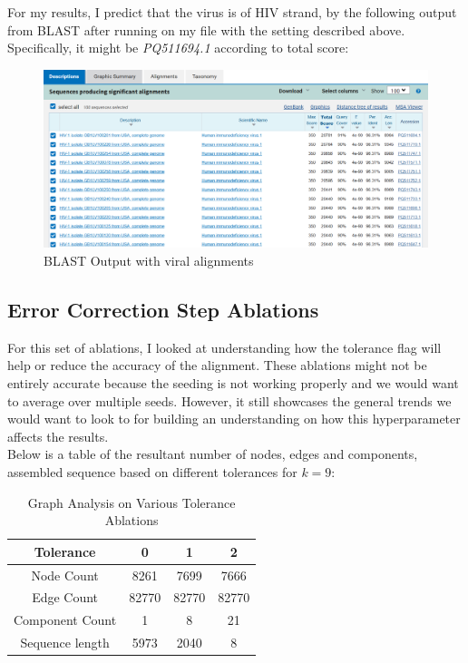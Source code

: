 \documentclass[10pt]{article}
\begin{document}
For my results, I predict that the virus is of HIV strand, by the following output from BLAST after running on my file with the setting described above. Specifically, it might be \textit{PQ511694.1} according to total score:
\begin{figure}[htbp]
    \centering
    \includegraphics[width=\textwidth]{figures/blast_output_k_10.PNG}
    \caption{BLAST Output with viral alignments}
    \label{fig:figure_7}
\end{figure}

\subsection*{Error Correction Step Ablations}
For this set of ablations, I looked at understanding how the tolerance flag will help or reduce the accuracy of the alignment. These ablations might not be entirely accurate because the seeding is not working properly and we would want to average over multiple seeds. However, it still showcases the general trends we would want to look to for building an understanding on how this hyperparameter affects the results.\\

Below is a table of the resultant number of nodes, edges and components, assembled sequence based on different tolerances for $k=9$:\\
\begin{table}[h]
\centering
\begin{tabular}{c|ccc}
Tolerance & 0 & 1 & 2 \\ \hline
Node Count & 8261 & 7699 & 7666 \\
\hline
Edge Count & 82770 & 82770 & 82770 \\
\hline
Component Count & 1 & 8 & 21\\
\hline
Sequence length & 5973 & 2040 & 8
\end{tabular}
\caption{Graph Analysis on Various Tolerance Ablations}
\label{tab:table_1}
\end{table}
\end{document}
